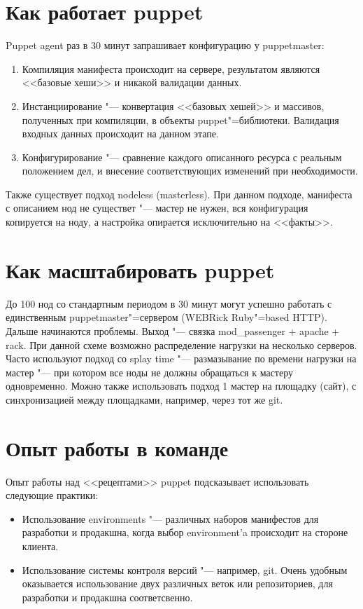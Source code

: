 \documentclass[10pt, a5paper]{article}
\begin{document}
\section*{Как работает puppet}

Puppet agent раз в 30 минут запрашивает конфигурацию у puppetmaster:

\begin{enumerate}
  \item Компиляция манифеста происходит на сервере, результатом являются <<базовые хеши>> и никакой валидации данных.
  \item Инстанциирование "--- конвертация <<базовых хешей>> и массивов, полученных при компиляции, в объекты puppet"=библиотеки. Валидация входных данных происходит на данном этапе.
  \item Конфигурирование "--- сравнение каждого описанного ресурса с реальным положением дел, и внесение соответствующих изменений при необходимости.
\end{enumerate}

Также существует подход nodeless (masterless). При данном подходе, манифеста с описанием нод не существет "--- мастер не нужен, вся конфигурация копируется на ноду, а настройка опирается исключительно на <<факты>>.

\section*{Как масштабировать puppet}

До 100 нод со стандартным периодом в 30 минут могут успешно работать с единственным puppetmaster"=сервером (WEBRick Ruby"=based HTTP). Дальше начинаются проблемы. Выход "--- связка mod\_passenger + apache + rack. При данной схеме возможно распределение нагрузки на несколько серверов. Часто используют подход со splay time "--- размазывание по времени нагрузки на мастер "--- при котором все ноды не должны обращаться к мастеру одновременно. Можно также использовать подход 1 мастер на площадку (сайт), с синхронизацией между площадками, например, через тот же git.

\section*{Опыт работы в команде}

Опыт работы над <<рецептами>> puppet подсказывает использовать следующие практики:

\begin{itemize}
  \item Использование environments "--- различных наборов манифестов для разработки и продакшна, когда выбор environment'a происходит на стороне клиента.
  \item Использование системы контроля версий "--- например, git. Очень удобным оказывается использование двух различных веток или репозиториев, для разработки и продакшна соответсвенно.
\end{itemize}
\end{document}
